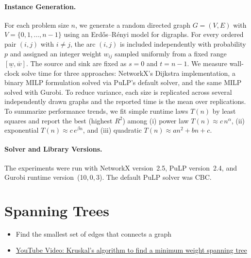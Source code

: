 \paragraph{Instance Generation.}
For each problem size \(n\), we generate a random directed graph \(G=(V,E)\) with \(V=\{0,1,\dots,n-1\}\) using an Erd\H{o}s--R\'enyi model for digraphs. For every ordered pair \((i,j)\) with \(i\neq j\), the arc \((i,j)\) is included independently with probability \(p\) and assigned an integer weight \(w_{ij}\) sampled uniformly from a fixed range \([\underline{w},\overline{w}]\). The source and sink are fixed as \(s=0\) and \(t=n-1\). We measure wall-clock solve time for three approaches: NetworkX’s Dijkstra implementation, a binary MILP formulation solved via PuLP’s default solver, and the same MILP solved with Gurobi. To reduce variance, each size is replicated across several independently drawn graphs and the reported time is the mean over replications. To summarize performance trends, we fit simple runtime laws \(T(n)\) by least squares and report the best (highest \(R^2\)) among (i) power law \(T(n)\approx c\,n^{\alpha}\), (ii) exponential \(T(n)\approx c\,e^{\beta n}\), and (iii) quadratic \(T(n)\approx a n^2+ b n + c\).

\paragraph{Solver and Library Versions.}
The experiments were run with NetworkX version~2.5, PuLP version~2.4, and Gurobi runtime version~(10,\,0,\,3).  
The default PuLP solver was CBC.






\section{Spanning Trees}
\begin{outcome}
\begin{itemize}
\item Find the smallest set of edges that connects a graph
\end{itemize}
\end{outcome}

\begin{resource}
\begin{itemize}
\item \href{https://www.youtube.com/watch?v=SfyrD-ktYew&ab_channel=KimberlyBrehm}{YouTube Video: Kruskal's algorithm to find a minimum weight spanning tree}
\end{itemize}
\end{resource}

